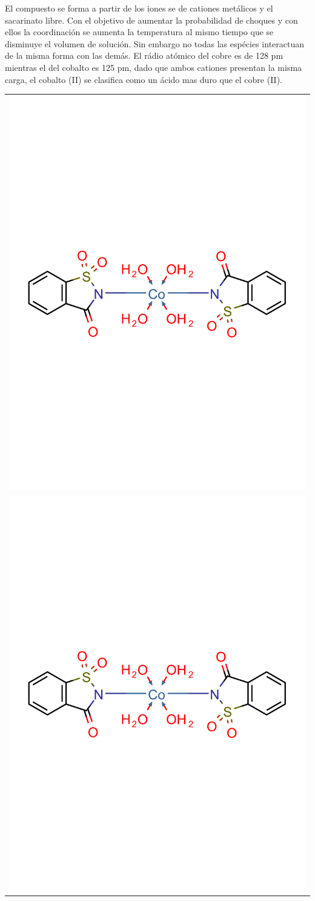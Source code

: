 \documentclass[fleqn,10pt]{SelfArx} %
\begin{document}
	El compuesto se forma a partir de los iones se de cationes met\'alicos y el sacarinato libre. Con el objetivo de aumentar la probabilidad de choques y con ellos la coordinaci\'on se aumenta la temperatura al mismo tiempo que se disminuye el volumen de soluci\'on. Sin embargo no todas las esp\'ecies interactuan de la misma forma con las dem\'as. El r\'adio at\'omico del cobre es de 128 pm mientras el del cobalto es 125 pm, dado que ambos cationes presentan la misma carga, el cobalto (II) se clasifica como un \'acido mas duro que el cobre (II).
	\begin{scheme}[h]
		\centering
		\begin{tabular}{c}
			\includegraphics[width=0.7\linewidth]{images/cobalt.pdf} \\
			\includegraphics[width=0.7\linewidth]{images/cobalt.pdf}
		\end{tabular}
		\caption{Estructura qu\'imica del tetraacuo-bis (o-sulfobenzoimido) cobre (II) y cobalto (II)}
		\label{sch: complexes}
	\end{scheme}
	
\end{document}
